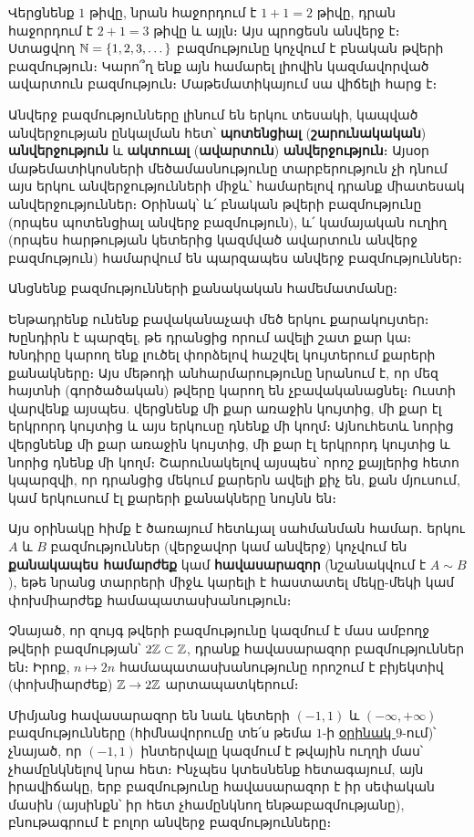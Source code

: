 \documentclass[./main.tex]{subfiles}
\begin{document}
\begin{example}\label{ch3ex1}
Վերցնենք $1$ թիվը, նրան հաջորդում է $1+1=2$ թիվը, դրան հաջոր\-դում է $2+1=3$ թիվը և այլն։ Այս պրոցեսն անվերջ է։ Ստացվող $\mathbb{N} = \{1, 2, 3, \dots\}$  բազ\-մու\-թյունը կոչվում է բնական թվերի բազմություն։ Կարո՞ղ ենք այն համարել լիովին կազմավորված ավարտուն բազմություն։ Մաթեմատիկայում սա վիճելի հարց է։
\end{example}
\par Անվերջ բազմությունները լինում են երկու տեսակի, կապված անվերջության ընկալման հետ՝ \textbf{պոտենցիալ} (\textbf{շարունակական}) \textbf{անվերջություն} և \textbf{ակտուալ} \linebreak (\textbf{ա\-վար\-տուն}) \textbf{անվերջություն}։ Այսօր մաթեմատիկոսների մեծամասնությունը \linebreak տար\-բերութ\-յուն չի դնում այս երկու անվերջությունների միջև՝ համարելով դրանք միա\-տեսակ ան\-վեր\-ջութ\-յուն\-ներ։ Օրինակ՝ և՛ բնական թվերի բազմությունը (որպես պո\-տեն\-ցիալ անվերջ բազմություն), և՛ կամայական ուղիղ  (որպես հարթության կե\-տե\-րից կազմված ավար\-տուն անվերջ բազմություն) համարվում են պարզապես ան\-վերջ բազմություններ։
\par Անցնենք բազմությունների քանակական համեմատմանը։
\begin{example}\label{ch3ex2}
Ենթադրենք ունենք բավականաչափ մեծ երկու քարակույտեր։ Խըն\-դիր\-ն է պարզել, թե դրանցից որում ավելի շատ քար կա։ Խնդիրը կարող ենք լուծել փորձելով հաշվել կույտերում քարերի քանակները։ Այս մեթոդի անհարմարությունը նրանում է, որ մեզ հայտնի (գործածական) թվերը կարող են չբավականացնել։ Ուստի վարվենք այսպես. վերցնենք մի քար առաջին կույտից, մի քար էլ երկրորդ կույտից և այս երկուսը դնենք մի կողմ։ Այնուհետև նորից վերցնենք մի քար առաջին կույտից, մի քար էլ երկրորդ կույտից և նորից դնենք մի կողմ։ Շարունակելով այսպես՝ որոշ քայլերից հետո կպարզվի, որ դրանցից մեկում քարերն ավելի քիչ են, քան մյուսում, կամ երկուսում էլ քարերի քանակները նույնն են։
\end{example}
\par Այս օրինակը հիմք է ծառայում հետևյալ սահմանման համար․ երկու $A$ և $B$ բազ\-մութ\-յուն\-ներ (վերջավոր կամ անվերջ) կոչվում են \textbf{քանակապես համարժեք} կամ \textbf{հա\-վա\-սա\-րա\-զոր} (նշանակվում է $A \sim B$), եթե նրանց տարրերի միջև կարելի է հաստատել մեկը-մեկի կամ փոխ\-միարժեք համապատասխանություն։
\begin{example}\label{ch3ex3}
Չնայած, որ զույգ թվերի բազմությունը կազմում է մաս ամբողջ թվերի բազմության՝ $2\mathbb{Z} \subset \mathbb{Z}$, դրանք հավասարազոր բազմություններ են։ Իրոք, $n \mapsto 2n$ համապատասխանությունը որոշում է բիյեկտիվ (փոխմիարժեք) $\mathbb{Z} \to 2\mathbb{Z}$ արտապատկերում։
\par Միմյանց հավասարազոր են նաև կետերի $(-1, 1)$ և $(-\infty, +\infty )$ բազմություննե\-րը (հիմնավորումը տե՛ս թեմա $1$-ի \hyperref[ch1ex9]{օրինակ $9$}-ում)՝ չնայած, որ $(-1, 1)$ ինտերվալը կազ\-մում է թվային ուղղի մաս՝ չհամընկնելով նրա հետ։ Ինչպես կտեսնենք հետա\-գա\-յում, այն իրավիճակը, երբ բազմությունը հավասարազոր է իր սեփական մասին (այս\-ինքն՝ իր հետ չհամընկնող են\-թա\-բազ\-մութ\-յանը), բնութա\-գրում է բոլոր անվերջ բազ\-մու\-թյուն\-ները։
\end{example}
\end{document}

